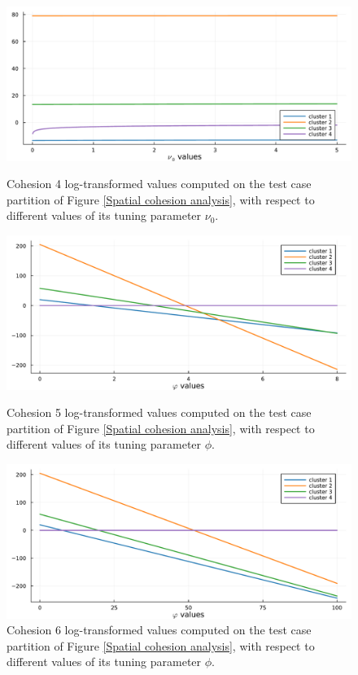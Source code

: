 \documentclass[12pt,	%
	a4paper,		%
	twoside,		%
	openright,		%
	titlepage,%
	]{book}
\theoremstyle{definition}
\begin{document}
\begin{figure}[!p]
\centering
\includegraphics[width=1\linewidth]{model description/new space plots/cohesion4.pdf}
\caption[Spatial cohesion 4 analysis]{Cohesion 4 log-transformed values computed on the test case partition of Figure \ref{Spatial cohesion analysis}, with respect to different values of its tuning parameter $\nu_0$.}
\label{sub:cohes4}
\includegraphics[width=1\linewidth]{model description/new space plots/cohesion5.pdf}
\caption[Spatial cohesion 5 analysis]{Cohesion 5 log-transformed values computed on the test case partition of Figure \ref{Spatial cohesion analysis}, with respect to different values of its tuning parameter $\phi$.}
\label{sub:cohes5}
\includegraphics[width=1\linewidth]{model description/new space plots/cohesion6.pdf}
\caption[Spatial cohesion 6 analysis]{Cohesion 6 log-transformed values computed on the test case partition of Figure \ref{Spatial cohesion analysis}, with respect to different values of its tuning parameter $\phi$.}
\label{sub:cohes6}
\end{figure}
\end{document}
